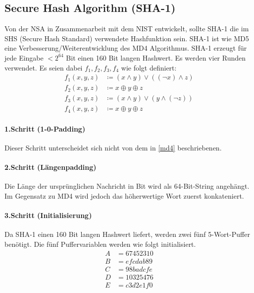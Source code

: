\documentclass[12pt,a4paper]{scrartcl}
\numberwithin{equation}{section}
\numberwithin{myalgctr}{section}
\numberwithin{mytheoremctr}{section}
\newcommand{\mpar}[1]{\paragraph*{#1}\mbox{}\par}
\begin{document}
	
	
	
	\newpage
	\subsection{Secure Hash Algorithm (SHA-1)}
	Von der NSA in Zusammenarbeit mit dem NIST entwickelt, sollte SHA-1 die im SHS (Secure Hash Standard) verwendete Hashfunktion sein. SHA-1 ist wie MD5 eine Verbesserung/Weiterentwicklung des MD4 Algorithmus. SHA-1 erzeugt für jede Eingabe $<2^{64}$ Bit einen 160 Bit langen Hashwert. Es werden vier Runden verwendet. Es seien dabei $f_1,f_2,f_3,f_4$ wie folgt definiert:\autocite[vgl.][504]{angewandteKryptographie}
	\begin{align*}
	f_1(x, y, z) &\coloneqq (x\wedge y)\vee ((\neg x)\wedge z)\\
	f_2(x, y, z) &\coloneqq x\oplus y\oplus z\\
	f_3(x, y, z) &\coloneqq (x\wedge y)\vee (y\wedge (\neg z))\\ 
	f_4(x, y, z) &\coloneqq x\oplus y\oplus z
	\end{align*}
	
	\mpar{1.Schritt (1-0-Padding)}\noindent
	Dieser Schritt unterscheidet sich nicht von dem in \cref{md4} beschriebenen.
	\mpar{2.Schritt (Längenpadding)}\noindent
	Die Länge der ursprünglichen Nachricht in Bit wird als 64-Bit-String angehängt. Im Gegensatz zu MD4 wird jedoch das höherwertige Wort zuerst konkateniert. \autocite[vgl.][S. 26 f.]{md4Familie}
	\mpar{3.Schritt (Initialisierung)}\noindent
	Da SHA-1 einen 160 Bit langen Hashwert liefert, werden zwei fünf 5-Wort-Puffer benötigt. Die fünf Puffervariablen werden wie folgt initialisiert. \autocite[vgl.][S. 505 f.]{angewandteKryptographie}
	\begin{align*}
		A&=67452310\\
		B&=efcdab89\\
		C&=98badcfe\\
		D&=10325476\\
		E&=c3d2e1f0
	\end{align*}
	
\end{document}
